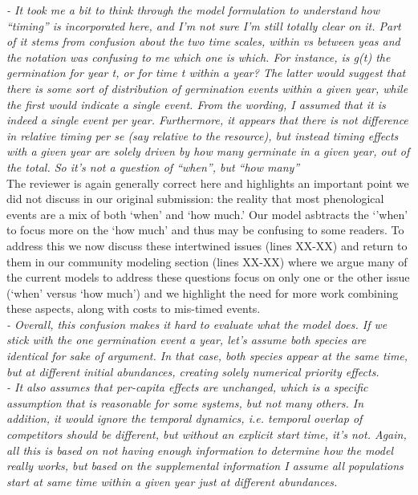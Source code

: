 \documentclass[11pt]{article}
\begin{document}
\emph{-       It took me a bit to think through the model formulation to understand how ``timing'' is
incorporated here, and I’m not sure I’m still totally clear on it. Part of it stems from
confusion about the two time scales, within vs between yeas and the notation was confusing to
me which one is which. For instance, is g(t) the germination for year t, or for time t within
a year? The latter would suggest that there is some sort of distribution of germination
events within a given year, while the first would indicate a single event. From the wording,
I assumed that it is indeed a single event per year. Furthermore, it appears that there is
not difference in relative timing per se (say relative to the resource), but instead timing
 effects with a given year are solely driven by how many germinate in a given year, out of the
total. So it’s not a question of ``when'', but ``how many''}\\

The reviewer is again generally correct here and highlights an important point we did not discuss in our original submission: the reality that most phenological events are a mix of both `when' and `how much.' Our model asbtracts the `'when' to focus more on the `how much' and thus may be confusing to some readers. To address this we now discuss these intertwined issues (lines XX-XX) and return to them in our community modeling section (lines XX-XX) where we argue many of the current models to address these questions focus on only one or the other issue (`when' versus `how much') and we highlight the need for more work combining these aspects, along with costs to mis-timed events. \\

\emph{-       Overall, this confusion makes it hard to evaluate what the model does. If we stick
with the one germination event a year, let’s assume both species are identical for sake of
argument. In that case, both species appear at the same time, but at different initial
abundances, creating solely numerical priority effects.\\
-       It also assumes that per-capita effects are unchanged, which is a specific assumption
that is reasonable for some systems, but not many others.  In addition, it would ignore the
temporal dynamics, i.e. temporal overlap of competitors should be different, but without an
explicit start time, it’s not. Again, all this is based on not having enough information to
determine how the model really works, but based on the supplemental information I assume all
populations start at same time within a given year just at different abundances.}\\
\end{document}
